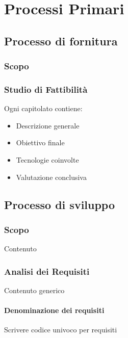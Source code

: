 \section{Processi Primari}\label{PP}

    \subsection{Processo di fornitura}\label{PP:Fornitura}	%

        \subsubsection{Scopo}\label{PP:Fornitura:Scopo}


        \subsubsection{Studio di Fattibilità}\label{PP:Fornitura:SdF} 
        	Ogni capitolato contiene:
        	\begin{itemize}
        		\item Descrizione generale
        		\item Obiettivo finale
        		\item Tecnologie coinvolte
        		\item Valutazione conclusiva
        	\end{itemize}


    \subsection{Processo di sviluppo}\label{PP:Sviluppo}

        \subsubsection{Scopo}\label{PP:Sviluppo:Scopo}
        Contenuto


        \subsubsection{Analisi dei Requisiti}\label{PP:Sviluppo:AdR}
        Contenuto generico
        

		        \paragraph{Denominazione dei requisiti}\label{PP:Sviluppo:AdR:DenominazioneRequisiti}
		        Scrivere codice univoco per requisiti
	
